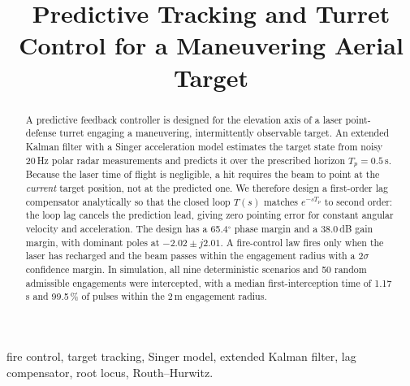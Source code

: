 \documentclass[conference]{IEEEtran}
\newcommand{\Tp}{T_p}
\begin{document}
\title{Predictive Tracking and Turret Control for a Maneuvering Aerial Target }

\author{
}

\maketitle

\begin{abstract}
A predictive feedback controller is designed for the elevation axis of a laser
point-defense turret engaging a maneuvering, intermittently observable target.
An extended Kalman filter with a Singer acceleration model estimates the target
state from noisy 20\,Hz polar radar measurements and predicts it over the
prescribed horizon $\Tp=0.5$\,s. Because the laser time of flight is negligible,
a hit requires the beam to point at the \emph{current} target position, not at the
predicted one. We therefore design a first-order lag compensator analytically so
that the closed loop $T(s)$ matches $e^{-s\Tp}$ to second order: the loop lag
cancels the prediction lead, giving zero pointing error for constant angular
velocity and acceleration. The design has a 65.4$^\circ$ phase margin and a
38.0\,dB gain margin, with dominant poles at $-2.02\pm j2.01$. A fire-control
law fires only when the laser has recharged and the beam passes within the
engagement radius with a $2\sigma$ confidence margin. In simulation, all nine
deterministic scenarios and 50 random admissible engagements were intercepted,
with a median first-interception time of 1.17\,s and 99.5\,\% of pulses within
the 2\,m engagement radius.
\end{abstract}

\begin{IEEEkeywords}
fire control, target tracking, Singer model, extended Kalman filter, lag compensator, root locus, Routh--Hurwitz.
\end{IEEEkeywords}

\end{document}
